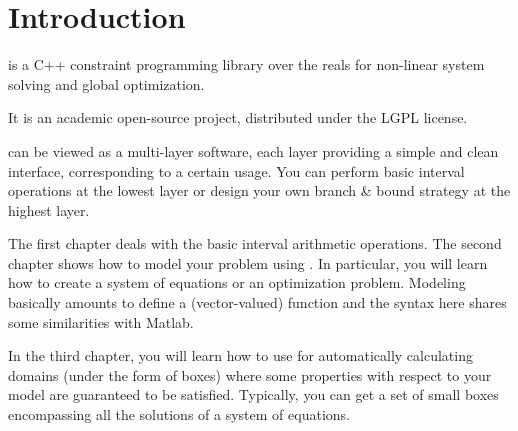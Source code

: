\chapter{Introduction}


\ibex is a C++ constraint programming library over the reals for non-linear system solving and global optimization.

It is an academic open-source project, distributed under the LGPL license.

\ibex can be viewed as a multi-layer software, each layer providing a simple and clean interface, corresponding to a certain usage.
You can perform basic interval operations at the lowest layer or design your own branch \& bound strategy at the highest layer.



The first chapter deals with the basic interval arithmetic operations.
The second chapter shows how to model your problem using \ibex.
In particular, you will learn how to create a system of equations or an optimization problem. Modeling basically amounts to
define a (vector-valued) function and the syntax here shares some similarities with Matlab.

In the third chapter, you will learn how to use \ibex for automatically calculating domains (under the form of boxes) where some 
properties with respect to your model are guaranteed to be satisfied. 
Typically, you can get a set of small boxes encompassing all the solutions of a system of equations.


